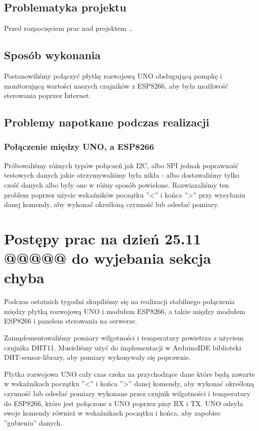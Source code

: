 \documentclass[12pt]{article}
\begin{document}
\subsection{Problematyka projektu}
Przed rozpoczęciem prac nad projektem .. 

\subsection{Sposób wykonania}
Postanowiliśmy połączyć płytkę rozwojową UNO obsługującą pompkę i monitorującą wartości naszych czujników z ESP8266, aby była możliwość sterowania poprzez Internet.
\subsection{Problemy napotkane podczas realizacji}
\subsubsection{Połączenie między UNO, a ESP8266}
Próbowaliśmy różnych typów połączeń jak I2C, albo SPI jednak poprawność testowych danych jakie otrzymywaliśmy była nikła - albo dostawaliśmy tylko cześć danych albo były one w różny sposób powielone.
Rozwiazaliśmy ten problem poprzez użycie wskaźników początku ''<'' i końca ''>'' przy wysyłaniu danej komendy, aby wykonać określoną czynność lub odesłać pomiary. 

\section{Postępy prac na dzień 25.11 @@@@@ do wyjebania sekcja chyba}
Podczas ostatnich tygodni skupiliśmy się na realizacji stabilnego połączenia między płytką rozwojową UNO i modułem ESP8266, a także między modułem ESP8266 i panelem sterowania na serwerze.

Zaimplementowaliśmy pomiary wilgotności i temperatury powietrza z użyciem czujnika DHT11. Musieliśmy użyć do implementacji w ArduinoIDE biblioteki DHT-sensor-library, aby pomiary wykonywały się poprawnie.

Płytka rozwojowa UNO cały czas czeka na przychodzące dane które będą zawarte w wskaźnikach początku ''<'' i końca ''>'' danej komendy, aby wykonać określoną czynność lub odesłać pomiary wykonane przez czujnik wilgotności i temperatury do ESP8266, które jest połączone z UNO poprzez piny RX i TX. UNO odsyła swoje komendy również w wskaźnikach początku i końca, aby zapobiec ''gubieniu'' danych.
\end{document}
